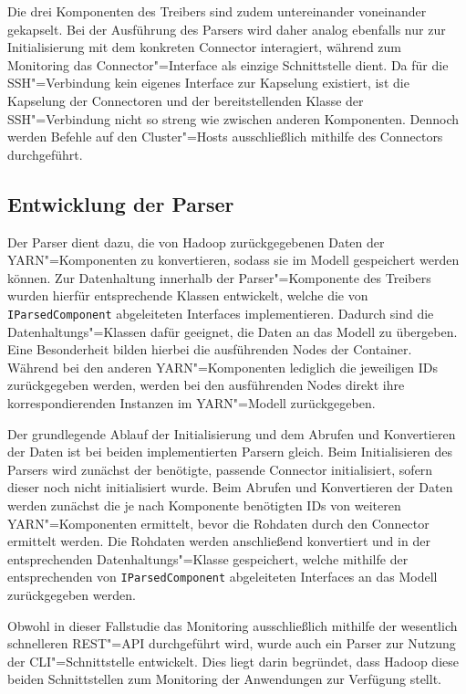 Die drei Komponenten des Treibers sind zudem untereinander  voneinander gekapselt.
Bei der Ausführung des Parsers wird daher analog ebenfalls nur zur Initialisierung mit dem konkreten Connector interagiert, während zum Monitoring das Connector"=Interface als einzige Schnittstelle dient.
Da für die SSH"=Verbindung kein eigenes Interface zur Kapselung existiert, ist die Kapselung der Connectoren und der bereitstellenden Klasse der SSH"=Verbindung nicht so streng wie zwischen anderen Komponenten.
Dennoch werden Befehle auf den Cluster"=Hosts ausschließlich mithilfe des Connectors durchgeführt.

\subsection{Entwicklung der Parser}
\label{subsec:implementedParsers}

Der Parser dient dazu, die von Hadoop zurückgegebenen Daten der YARN"=Komponenten zu konvertieren, sodass sie im Modell gespeichert werden können.
Zur Datenhaltung innerhalb der Parser"=Komponente des Treibers wurden hierfür entsprechende Klassen entwickelt, welche die von \texttt{IParsedComponent} abgeleiteten Interfaces implementieren.
Dadurch sind die Datenhaltungs"=Klassen dafür geeignet, die Daten an das Modell zu übergeben.
Eine Besonderheit bilden hierbei die ausführenden Nodes der Container.
Während bei den anderen YARN"=Komponenten lediglich die jeweiligen IDs zurückgegeben werden, werden bei den ausführenden Nodes direkt ihre korrespondierenden Instanzen im YARN"=Modell zurückgegeben.

Der grundlegende Ablauf der Initialisierung und dem Abrufen und Konvertieren der Daten ist bei beiden implementierten Parsern gleich.
Beim Initialisieren des Parsers wird zunächst der benötigte, passende Connector initialisiert, sofern dieser noch nicht initialisiert wurde.
Beim Abrufen und Konvertieren der Daten werden zunächst die je nach Komponente benötigten IDs von weiteren YARN"=Komponenten ermittelt, bevor die Rohdaten durch den Connector ermittelt werden.
Die Rohdaten werden anschließend konvertiert und in der entsprechenden Datenhaltungs"=Klasse gespeichert, welche mithilfe der entsprechenden von \texttt{IParsedComponent} abgeleiteten Interfaces an das Modell zurückgegeben werden.

Obwohl in dieser Fallstudie das Monitoring ausschließlich mithilfe der wesentlich schnelleren REST"=API durchgeführt wird, wurde auch ein Parser zur Nutzung der \gls{CLI}"=Schnittstelle entwickelt.
Dies liegt darin begründet, dass Hadoop diese beiden Schnittstellen zum Monitoring der Anwendungen zur Verfügung stellt.

